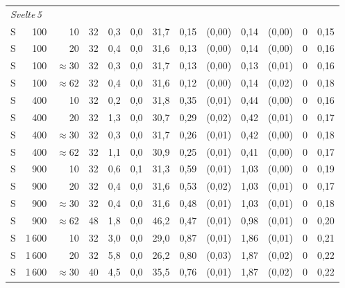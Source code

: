 \begin{landscape}
{\begin{longtable}{@{}l r r r  r r r  r r  r r  r r@{}}
\midrule\midrule
\multicolumn{13}{l}{\textit{Svelte\,5}} \\[2pt]
S &    100 & 10           &  32 &  0{,}3 & 0{,}0 &  31{,}7 &  0{,}15 & (0{,}00) &  0{,}14 & (0{,}00) &      0 & 0{,}15 \\
S &    100 & 20           &  32 &  0{,}4 & 0{,}0 &  31{,}6 &  0{,}13 & (0{,}00) &  0{,}14 & (0{,}00) &      0 & 0{,}16 \\
S &    100 & ${\approx}30$ &  32 &  0{,}3 & 0{,}0 &  31{,}7 &  0{,}13 & (0{,}00) &  0{,}13 & (0{,}01) &      0 & 0{,}16 \\
S &    100 & ${\approx}62$ &  32 &  0{,}4 & 0{,}0 &  31{,}6 &  0{,}12 & (0{,}00) &  0{,}14 & (0{,}02) &      0 & 0{,}18 \\
\midrule
S &    400 & 10           &  32 &  0{,}2 & 0{,}0 &  31{,}8 &  0{,}35 & (0{,}01) &  0{,}44 & (0{,}00) &      0 & 0{,}16 \\
S &    400 & 20           &  32 &  1{,}3 & 0{,}0 &  30{,}7 &  0{,}29 & (0{,}02) &  0{,}42 & (0{,}01) &      0 & 0{,}17 \\
S &    400 & ${\approx}30$ &  32 &  0{,}3 & 0{,}0 &  31{,}7 &  0{,}26 & (0{,}01) &  0{,}42 & (0{,}00) &      0 & 0{,}18 \\
S &    400 & ${\approx}62$ &  32 &  1{,}1 & 0{,}0 &  30{,}9 &  0{,}25 & (0{,}01) &  0{,}41 & (0{,}00) &      0 & 0{,}17 \\
\midrule
S &    900 & 10           &  32 &  0{,}6 & 0{,}1 &  31{,}3 &  0{,}59 & (0{,}01) &  1{,}03 & (0{,}00) &      0 & 0{,}19 \\
S &    900 & 20           &  32 &  0{,}4 & 0{,}0 &  31{,}6 &  0{,}53 & (0{,}02) &  1{,}03 & (0{,}01) &      0 & 0{,}17 \\
S &    900 & ${\approx}30$ &  32 &  0{,}4 & 0{,}0 &  31{,}6 &  0{,}48 & (0{,}01) &  1{,}03 & (0{,}01) &      0 & 0{,}18 \\
S &    900 & ${\approx}62$ &  48 &  1{,}8 & 0{,}0 &  46{,}2 &  0{,}47 & (0{,}01) &  0{,}98 & (0{,}01) &      0 & 0{,}20 \\
\midrule
S & 1\,600 & 10           &  32 &  3{,}0 & 0{,}0 &  29{,}0 &  0{,}87 & (0{,}01) &  1{,}86 & (0{,}01) &      0 & 0{,}21 \\
S & 1\,600 & 20           &  32 &  5{,}8 & 0{,}0 &  26{,}2 &  0{,}80 & (0{,}03) &  1{,}87 & (0{,}02) &      0 & 0{,}22 \\
S & 1\,600 & ${\approx}30$ &  40 &  4{,}5 & 0{,}0 &  35{,}5 &  0{,}76 & (0{,}01) &  1{,}87 & (0{,}02) &      0 & 0{,}22 \\

\end{longtable}}
\end{landscape}
